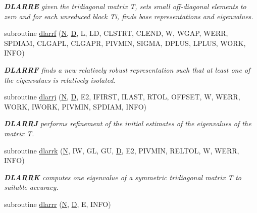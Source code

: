 \begin{DoxyCompactItemize}
\begin{DoxyCompactList}\small\item\em {\bfseries D\+L\+A\+R\+R\+E} given the tridiagonal matrix T, sets small off-\/diagonal elements to zero and for each unreduced block Ti, finds base representations and eigenvalues. \end{DoxyCompactList}\item 
subroutine \hyperlink{group__auxOTHERauxiliary_ga6fa2f60646088821e40fbe04a41aa7b1}{dlarrf} (\hyperlink{polmisc_8c_a0240ac851181b84ac374872dc5434ee4}{N}, \hyperlink{odrpack_8h_a7dae6ea403d00f3687f24a874e67d139}{D}, L, L\+D, C\+L\+S\+T\+R\+T, C\+L\+E\+N\+D, W, W\+G\+A\+P, W\+E\+R\+R, S\+P\+D\+I\+A\+M, C\+L\+G\+A\+P\+L, C\+L\+G\+A\+P\+R, P\+I\+V\+M\+I\+N, S\+I\+G\+M\+A, D\+P\+L\+U\+S, L\+P\+L\+U\+S, W\+O\+R\+K, I\+N\+F\+O)
\begin{DoxyCompactList}\small\item\em {\bfseries D\+L\+A\+R\+R\+F} finds a new relatively robust representation such that at least one of the eigenvalues is relatively isolated. \end{DoxyCompactList}\item 
subroutine \hyperlink{group__auxOTHERauxiliary_ga7cdb25c9766674132d73bcbba824ab31}{dlarrj} (\hyperlink{polmisc_8c_a0240ac851181b84ac374872dc5434ee4}{N}, \hyperlink{odrpack_8h_a7dae6ea403d00f3687f24a874e67d139}{D}, E2, I\+F\+I\+R\+S\+T, I\+L\+A\+S\+T, R\+T\+O\+L, O\+F\+F\+S\+E\+T, W, W\+E\+R\+R, W\+O\+R\+K, I\+W\+O\+R\+K, P\+I\+V\+M\+I\+N, S\+P\+D\+I\+A\+M, I\+N\+F\+O)
\begin{DoxyCompactList}\small\item\em {\bfseries D\+L\+A\+R\+R\+J} performs refinement of the initial estimates of the eigenvalues of the matrix T. \end{DoxyCompactList}\item 
subroutine \hyperlink{group__auxOTHERauxiliary_gad321b234af8d1ac9fbb18ca95a1c13f2}{dlarrk} (\hyperlink{polmisc_8c_a0240ac851181b84ac374872dc5434ee4}{N}, I\+W, G\+L, G\+U, \hyperlink{odrpack_8h_a7dae6ea403d00f3687f24a874e67d139}{D}, E2, P\+I\+V\+M\+I\+N, R\+E\+L\+T\+O\+L, W, W\+E\+R\+R, I\+N\+F\+O)
\begin{DoxyCompactList}\small\item\em {\bfseries D\+L\+A\+R\+R\+K} computes one eigenvalue of a symmetric tridiagonal matrix T to suitable accuracy. \end{DoxyCompactList}\item 
subroutine \hyperlink{group__auxOTHERauxiliary_gafe58120dedcb8d85c7a689c2d822f4a6}{dlarrr} (\hyperlink{polmisc_8c_a0240ac851181b84ac374872dc5434ee4}{N}, \hyperlink{odrpack_8h_a7dae6ea403d00f3687f24a874e67d139}{D}, E, I\+N\+F\+O)

\end{DoxyCompactItemize}
